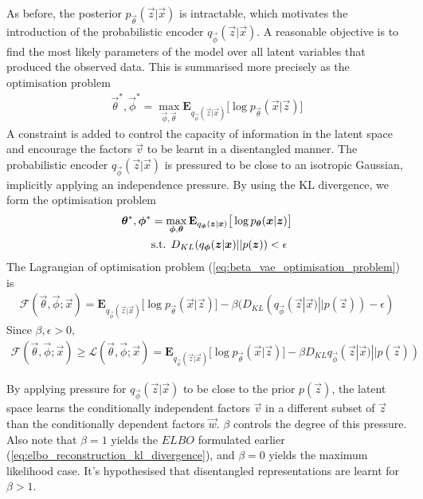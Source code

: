 As before, the posterior $p_{\vec{\theta}}(\vec{z}|\vec{x})$ is intractable, which motivates the introduction of the probabilistic encoder $q_{\vec{\phi}}(\vec{z} | \vec{x})$. A reasonable objective is to find the most likely parameters of the model over all latent variables that produced the observed data. This is summarised more precisely as the optimisation problem
\begin{align}
\vec{\theta}^*, \vec{\phi}^* = \max_{\vec{\phi}, \vec{\theta}} \mathbf{E}_{q_{\vec{\phi}}(\vec{z} | \vec{x})} \big[ \log p_{\vec{\theta}}(\vec{x} | \vec{z}) \big]
\end{align}
A constraint is added to control the capacity of information in the latent space and encourage the factors $\vec{v}$ to be learnt in a disentangled manner. The probabilistic encoder $q_{\vec{\phi}}(\vec{z} | \vec{x})$ is pressured to be close to an isotropic Gaussian, implicitly applying an independence pressure. By using the KL divergence, we form the optimisation problem
\begin{align}
\vec{\theta}^*, \vec{\phi}^* &= \max_{\vec{\phi}, \vec{\theta}} \mathbf{E}_{q_{\vec{\phi}}(\vec{z} | \vec{x})} \big[ \log p_{\vec{\theta}}(\vec{x} | \vec{z}) \big] \label{eq:beta_vae_optimisation_problem}\\
&\textup{s.t. } D_{KL} (q_{\vec{\phi}}(\vec{z} | \vec{x}) || p(\vec{z})) < \epsilon \nonumber
\end{align}
The Lagrangian of optimisation problem (\ref{eq:beta_vae_optimisation_problem}) is
\begin{align}
\mathcal{F}(\vec{\theta}, \vec{\phi}; \vec{x}) = \mathbf{E}_{q_{\vec{\phi}}(\vec{z} | \vec{x})} \big[ \log p_{\vec{\theta}}(\vec{x} | \vec{z}) \big] - \beta(D_{KL} (q_{\vec{\phi}}(\vec{z} | \vec{x}) || p(\vec{z})) - \epsilon)
\end{align}
Since $\beta, \epsilon > 0$,
\begin{align}
\mathcal{F}(\vec{\theta}, \vec{\phi}; \vec{x}) \geq \mathcal{L}(\vec{\theta}, \vec{\phi}; \vec{x}) = \mathbf{E}_{q_{\vec{\phi}}(\vec{z} | \vec{x})} \big[ \log p_{\vec{\theta}}(\vec{x} | \vec{z}) \big] - \beta D_{KL} q_{\vec{\phi}}(\vec{z} | \vec{x}) || p(\vec{z}))
\end{align}


By applying pressure for $q_{\vec{\phi}}(\vec{z} | \vec{x})$ to be close to the prior $p(\vec{z})$, the latent space learns the conditionally independent factors $\vec{v}$ in a different subset of $\vec{z}$ than the conditionally dependent factors $\vec{w}$. $\beta$ controls the degree of this pressure. Also note that $\beta = 1$ yields the $ELBO$ formulated earlier (\ref{eq:elbo_reconstruction_kl_divergence}), and $\beta=0$ yields the maximum likelihood case. It's hypothesised that disentangled representations are learnt for $\beta > 1$.

